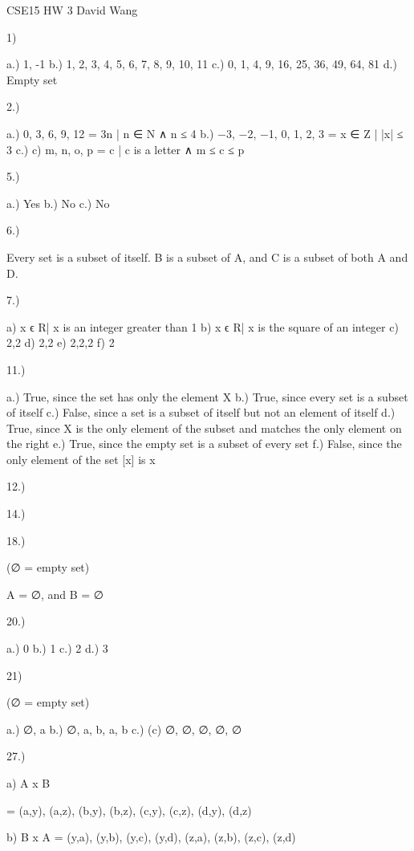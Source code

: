 CSE15 HW 3
David Wang

1)

	a.) {1, -1}
	b.) {1, 2, 3, 4, 5, 6, 7, 8, 9, 10, 11}
	c.) {0, 1, 4, 9, 16, 25, 36, 49, 64, 81}
	d.) Empty set

2.) 

	a.) {0, 3, 6, 9, 12} = {3n | n ∈ N ∧ n ≤ 4}
	b.) {−3, −2, −1, 0, 1, 2, 3} = {x ∈ Z | |x| ≤ 3}
	c.) c) {m, n, o, p} = {c | c is a letter ∧ m ≤ c ≤ p}

5.) 

	a.) Yes
	b.) No
	c.) No

6.)

	 Every set is a subset of itself. B is a subset of A, and C is a subset of both A and D.


7.) 

	a) 	{x ϵ R| x is an integer greater than 1}
	b)	 {x ϵ R| x is the square of an integer}
	c) 	{2,{2}}
	d) 	{{2},{{2}}}
	e) 	{{2},{2,{2}}}
	f) 	{{{2}}}


11.) 

	a.) True, since the set has only the element X
	b.) True, since every set is a subset of itself
	c.)  False, since a set is a subset of itself but not an element of itself
	d.) True, since X is the only element of the subset and matches the only element on the right
	e.) True, since the empty set is a subset of every set
	f.) False, since the only element of the set [x] is x

12.)



14.)

18.) 

	(∅ = empty set)

	A = ∅, and B = ∅ 

20.)

	a.) 0 
	b.) 1
	c.) 2
	d.) 3

21)

(∅ = empty set)

	a.) {∅, {a}}
	b.)  {∅, {a}, {b}, {a, b}}
	c.) (c) {∅, {∅}, {{∅}}, {∅, {∅}}}

27.) 

	a)
 	A x B

 	= {(a,y), (a,z), (b,y), (b,z), (c,y), (c,z), (d,y), (d,z)} 

	b)
 	B x A
 	= {(y,a), (y,b), (y,c), (y,d), (z,a), (z,b), (z,c), (z,d)} 